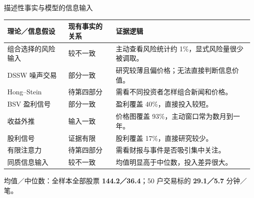 \begin{frame}[label=averages]{描述性事实与模型的信息输入}
  \footnotesize
  \setlength{\tabcolsep}{3pt}
  \renewcommand{\arraystretch}{1.06}
  \begin{tabularx}{\linewidth}{@{}L{.26\linewidth}L{.18\linewidth}Y@{}}
    \toprule 理论／信息假设 & 现有事实的关系 & 证据逻辑\\\midrule
    组合选择的风险输入 & 较不一致 & 主动查看风险统计约 1\%，显式风险量很少被调取。\\
    DSSW 噪声交易 & 部分一致 & 研究较薄且偏价格；无法直接判断信息价值。\\
    Hong--Stein & 待第四部分 & 需看不同投资者怎样组合新闻和价格。\\
    BSV 盈利信号 & 部分一致 & 盈利覆盖 40\%，直接投入较短。\\
    收益外推 & 输入一致 & 价格图覆盖 93\%，主动窗口常为数月到一年。\\
    股利信号 & 证据有限 & 股利覆盖 17\%，直接研究较少。\\
    有限注意力 & 待第四部分 & 需看财报与事件是否吸引集中关注。\\
    同质信息输入 & 较不一致 & 均值明显高于中位数，投入差异很大。\\
    \bottomrule
  \end{tabularx}
  \smallskip
  {\small 均值／中位数：全样本全部股票 \textbf{144.2／36.4}；50 户交易标的 \textbf{29.1／5.7} 分钟／笔。}
\end{frame}
